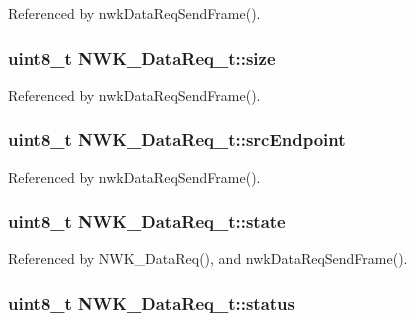 Referenced by nwk\-Data\-Req\-Send\-Frame().

\hypertarget{struct_n_w_k___data_req__t_a2057b79ca45a0a0ad6ab4ab80e66177e}{
\subsubsection[{size}]{\setlength{\rightskip}{0pt plus 5cm}uint8\-\_\-t N\-W\-K\-\_\-\-Data\-Req\-\_\-t\-::size}}\label{struct_n_w_k___data_req__t_a2057b79ca45a0a0ad6ab4ab80e66177e}


Referenced by nwk\-Data\-Req\-Send\-Frame().

\hypertarget{struct_n_w_k___data_req__t_a5839b1eb932cb128c133abe2f6661b95}{
\subsubsection[{src\-Endpoint}]{\setlength{\rightskip}{0pt plus 5cm}uint8\-\_\-t N\-W\-K\-\_\-\-Data\-Req\-\_\-t\-::src\-Endpoint}}\label{struct_n_w_k___data_req__t_a5839b1eb932cb128c133abe2f6661b95}


Referenced by nwk\-Data\-Req\-Send\-Frame().

\hypertarget{struct_n_w_k___data_req__t_a5a35c6f856e9a88ff80d5a1894e1bc8c}{
\subsubsection[{state}]{\setlength{\rightskip}{0pt plus 5cm}uint8\-\_\-t N\-W\-K\-\_\-\-Data\-Req\-\_\-t\-::state}}\label{struct_n_w_k___data_req__t_a5a35c6f856e9a88ff80d5a1894e1bc8c}


Referenced by N\-W\-K\-\_\-\-Data\-Req(), and nwk\-Data\-Req\-Send\-Frame().

\hypertarget{struct_n_w_k___data_req__t_abbb3d47babe69c1cae446f6f5f16e2ee}{
\subsubsection[{status}]{\setlength{\rightskip}{0pt plus 5cm}uint8\-\_\-t N\-W\-K\-\_\-\-Data\-Req\-\_\-t\-::status}}\label{struct_n_w_k___data_req__t_abbb3d47babe69c1cae446f6f5f16e2ee}


